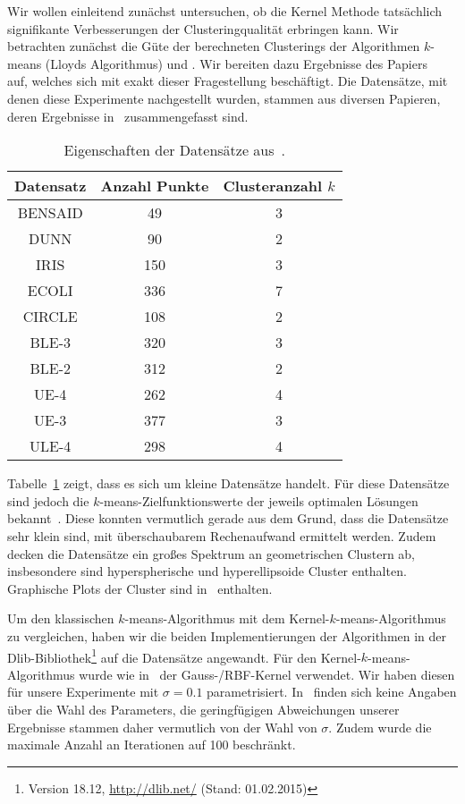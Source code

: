 Wir wollen einleitend zunächst untersuchen, ob die Kernel Methode tatsächlich signifikante Verbesserungen der
Clusteringqualität erbringen kann. Wir betrachten zunächst die Güte der berechneten Clusterings der Algorithmen
$k$-means (Lloyds Algorithmus) und \kkmpp{}. Wir bereiten dazu Ergebnisse des Papiers~\cite{KimLLL05} auf, welches sich mit
exakt dieser Fragestellung beschäftigt. Die Datensätze, mit denen diese Experimente nachgestellt wurden, stammen aus diversen
Papieren, deren Ergebnisse in~\cite{Bezdek99} zusammengefasst sind.
\begin{table}[t]
\centering
\begin{tabular}{@{}ccc@{}} \toprule
	\textbf{Datensatz} & \textbf{Anzahl Punkte} & \textbf{Clusteranzahl} $k$ \\ \midrule
	BENSAID & 49 & 3 \\
	DUNN & 90 & 2 \\
	IRIS & 150 & 3 \\
	ECOLI & 336 & 7 \\
	CIRCLE & 108 & 2 \\
	BLE-3 & 320 & 3 \\
	BLE-2 & 312 & 2 \\
	UE-4 & 262 & 4 \\
	UE-3 & 377 & 3 \\
	ULE-4 & 298 & 4 \\ \bottomrule
\end{tabular}
\caption{Eigenschaften der Datensätze aus~\cite{Bezdek99}.}
\label{tbl:experiment-kernel-method-quality-datasets}
\end{table}
Tabelle~\ref{tbl:experiment-kernel-method-quality-datasets} zeigt, dass es sich um kleine Datensätze handelt. Für diese
Datensätze sind jedoch die $k$-means-Zielfunktionswerte der jeweils optimalen Lösungen bekannt~\cite{Bezdek99}. Diese konnten
vermutlich gerade aus dem Grund, dass die Datensätze sehr klein sind, mit überschaubarem Rechenaufwand ermittelt werden.
Zudem decken die Datensätze ein großes Spektrum an geometrischen Clustern ab, insbesondere sind hyperspherische und
hyperellipsoide Cluster enthalten. Graphische Plots der Cluster sind in~\cite{KimLLL05} enthalten.

Um den klassischen $k$-means-Algorithmus mit dem Kernel-$k$-means-Algorithmus zu vergleichen, haben wir die beiden
Implementierungen der Algorithmen in der Dlib-Bibliothek\footnote{Version 18.12, \url{http://dlib.net/} (Stand: 01.02.2015)}
auf die Datensätze angewandt. Für den Kernel-$k$-means-Algorithmus wurde wie in~\cite{KimLLL05} der Gauss-/RBF-Kernel
verwendet. Wir haben diesen für unsere Experimente mit $\sigma = 0.1$ parametrisiert. In~\cite{KimLLL05} finden sich keine
Angaben über die Wahl des Parameters, die geringfügigen Abweichungen unserer Ergebnisse stammen daher vermutlich von der Wahl
von $\sigma$. Zudem wurde die maximale Anzahl an Iterationen auf 100 beschränkt.

